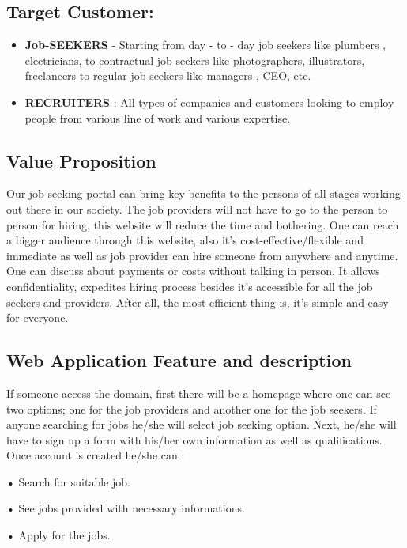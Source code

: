 \documentclass{article}
\begin{document}
\subsection{   \textbf{Target Customer:}
}
\begin{itemize}
\item \textbf{Job-SEEKERS} -  Starting from day - to - day job seekers like plumbers , electricians, to contractual job seekers like 
photographers, illustrators, freelancers to regular job seekers like managers , CEO, etc.
\end{itemize}

\begin{itemize}
\item \textbf{RECRUITERS }: All types of companies and customers looking to employ people from various line of work and various expertise.
\end{itemize}
 
\subsection{Value Proposition}
Our job seeking portal can bring key benefits to the persons of all
stages working out there in our society. The job providers will not 
have to go to the person to person for hiring, this website will 
reduce the time and bothering. One can reach a bigger audience 
through this website, also it’s cost-effective/flexible and 
immediate as well as job provider can hire someone from 
anywhere and anytime. One can discuss about payments or costs 
without talking in person. It allows confidentiality, expedites 
hiring process besides it’s accessible for all the job seekers and 
providers. After all, the most efficient thing is, it’s simple and 
easy for everyone.
\subsection{Web Application Feature and description}
If someone access the domain, first there will be a 
homepage where one can see two options; one for the job 
providers and another one for the job seekers.
If anyone searching for jobs he/she will select job seeking 
option. Next, he/she will have to sign up a form with 
his/her own information as well as qualifications. Once 
account is created he/she can :

• Search for suitable job.

• See jobs provided with necessary informations.

• Apply for the jobs.
\end{document}
